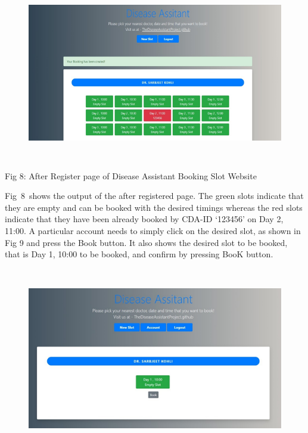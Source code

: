 \documentclass[12pt]{article}
\begin{document}
\begin{figure}[H]
	\begin{Center}
		\includegraphics[width=6.22in,height=3.01in]{./media/image12.png}
	\end{Center}
\end{figure}



\setlength{\parskip}{12.0pt}
\begin{Center}
Fig 8: After Register page of Disease Assistant Booking Slot Website
\end{Center}
\begin{justify}
Fig\ 8\ shows the output of the after registered page. The green slots indicate that they are empty and can be booked with the desired timings whereas the  red slots indicate that they have been already booked by  CDA-ID ‘123456’ on Day 2, 11:00. A particular account needs to simply click on the desired slot, as shown in Fig 9 and press the Book button. It also shows the desired slot to be booked, that is Day 1, 10:00 to be booked, and confirm by pressing BooK button.
\end{justify}



\begin{figure}[H]
	\begin{Center}
		\includegraphics[width=6.14in,height=3.14in]{./media/image11.png}
	\end{Center}
\end{figure}
\end{document}
